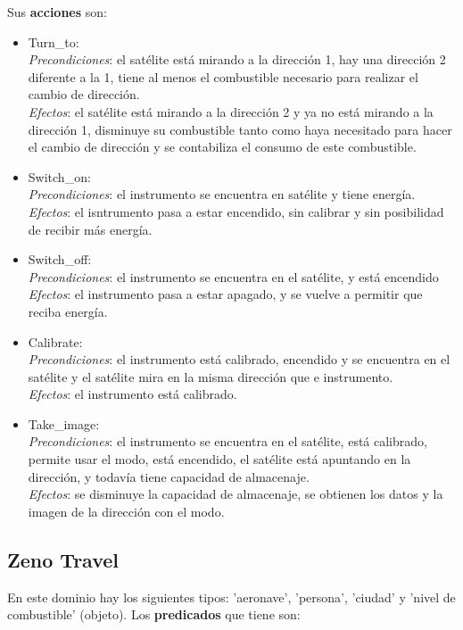 \documentclass{uc3mpracticas}
\begin{document}
  Sus \textbf{acciones} son:
  \begin{itemize}
    \item Turn\_to:
    \\\textit{Precondiciones}: el satélite está mirando a la dirección 1, hay una dirección 2 diferente a la 1, tiene al menos el combustible necesario para realizar el cambio de dirección.
    \\\textit{Efectos}: el satélite está mirando a la dirección 2 y ya no está mirando a la dirección 1, disminuye su combustible tanto como haya necesitado para hacer el cambio de dirección y se contabiliza el consumo de este combustible.
    \item Switch\_on:
    \\\textit{Precondiciones}: el instrumento se encuentra en satélite y tiene energía.
    \\\textit{Efectos}: el isntrumento pasa a estar encendido, sin calibrar y sin posibilidad de recibir más energía.
    \item Switch\_off:
    \\\textit{Precondiciones}: el instrumento se encuentra en el satélite, y está encendido
    \\\textit{Efectos}: el instrumento pasa a estar apagado, y se vuelve a permitir que reciba energía.
    \item Calibrate:
    \\\textit{Precondiciones}: el instrumento está calibrado, encendido y se encuentra en el satélite y el satélite mira en la misma dirección que e instrumento.
    \\\textit{Efectos}: el instrumento está calibrado.
    \item Take\_image:
    \\\textit{Precondiciones}: el instrumento se encuentra en el satélite, está calibrado, permite usar el modo, está encendido, el satélite está apuntando en la dirección, y todavía tiene capacidad de almacenaje.
    \\\textit{Efectos}: se disminuye la capacidad de almacenaje, se obtienen los datos y la imagen de la dirección con el modo.
  \end{itemize}


  \subsection{Zeno Travel}

  En este dominio hay los siguientes tipos: 'aeronave', 'persona', 'ciudad' y 'nivel de combustible' (objeto). Los \textbf{predicados} que tiene son:
\end{document}

